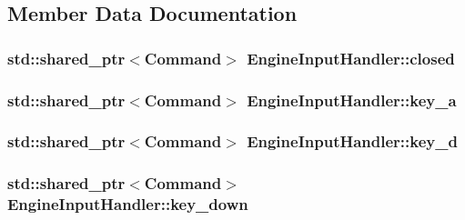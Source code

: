 \subsection{Member Data Documentation}
\hypertarget{class_engine_input_handler_a0795da79edb03ad26aa5d8aec9fc2a04}{}
\subsubsection[{closed}]{\setlength{\rightskip}{0pt plus 5cm}std\+::shared\+\_\+ptr$<${\bf Command}$>$ Engine\+Input\+Handler\+::closed\hspace{0.3cm}{\ttfamily [private]}}\label{class_engine_input_handler_a0795da79edb03ad26aa5d8aec9fc2a04}
\hypertarget{class_engine_input_handler_ae2da02fb4013bf0e85c951ad16efd48a}{}
\subsubsection[{key\+\_\+a}]{\setlength{\rightskip}{0pt plus 5cm}std\+::shared\+\_\+ptr$<${\bf Command}$>$ Engine\+Input\+Handler\+::key\+\_\+a\hspace{0.3cm}{\ttfamily [private]}}\label{class_engine_input_handler_ae2da02fb4013bf0e85c951ad16efd48a}
\hypertarget{class_engine_input_handler_a54e54d55b3fb0b52efcebe616849cdd1}{}
\subsubsection[{key\+\_\+d}]{\setlength{\rightskip}{0pt plus 5cm}std\+::shared\+\_\+ptr$<${\bf Command}$>$ Engine\+Input\+Handler\+::key\+\_\+d\hspace{0.3cm}{\ttfamily [private]}}\label{class_engine_input_handler_a54e54d55b3fb0b52efcebe616849cdd1}
\hypertarget{class_engine_input_handler_a6812313632a9cf68132b99b4179ab1a4}{}
\subsubsection[{key\+\_\+down}]{\setlength{\rightskip}{0pt plus 5cm}std\+::shared\+\_\+ptr$<${\bf Command}$>$ Engine\+Input\+Handler\+::key\+\_\+down\hspace{0.3cm}{\ttfamily [private]}}\label{class_engine_input_handler_a6812313632a9cf68132b99b4179ab1a4}
\hypertarget{class_engine_input_handler_a864479881a1e214952f4a2aea3a307bf}{}
